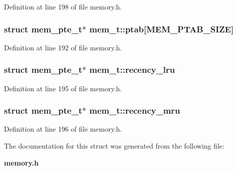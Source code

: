 Definition at line 198 of file memory.h.
\subsubsection[{ptab}]{\setlength{\rightskip}{0pt plus 5cm}struct {\bf mem\_\-pte\_\-t}$\ast$ {\bf mem\_\-t::ptab}[MEM\_\-PTAB\_\-SIZE]\hspace{0.3cm}{\tt  [read]}}\label{structmem__t_540974c961eb36f33c658f78cb69f1bb}




Definition at line 192 of file memory.h.
\subsubsection[{recency\_\-lru}]{\setlength{\rightskip}{0pt plus 5cm}struct {\bf mem\_\-pte\_\-t}$\ast$ {\bf mem\_\-t::recency\_\-lru}\hspace{0.3cm}{\tt  [read]}}\label{structmem__t_16f3ac184e31c4b8f567ce414d36386b}




Definition at line 195 of file memory.h.
\subsubsection[{recency\_\-mru}]{\setlength{\rightskip}{0pt plus 5cm}struct {\bf mem\_\-pte\_\-t}$\ast$ {\bf mem\_\-t::recency\_\-mru}\hspace{0.3cm}{\tt  [read]}}\label{structmem__t_539f982a8af74e4801e0de14a88f22fa}




Definition at line 196 of file memory.h.

The documentation for this struct was generated from the following file:\begin{CompactItemize}
\item 
{\bf memory.h}\end{CompactItemize}
